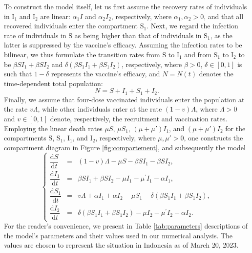 \documentclass[11pt,reqno]{amsart}
\newcommand{\de}{\text{d}}
\begin{document}
To construct the model itself, let us first assume the recovery rates of individuals in $\text{I}_1$ and $\text{I}_2$ are linear: $\alpha_1 I$ and $\alpha_2 I_2$, respectively, where $\alpha_1,\alpha_2>0$, and that all  recovered individuals enter the compartment $\text{S}_1$. Next, we regard the infection rate of individuals in $\text{S}$ as being higher than that of individuals in $\text{S}_1$, as the latter is suppressed by the vaccine's efficacy. Assuming the infection rates to be bilinear, we thus formulate the transition rates from $\text{S}$ to $\text{I}_1$ and from $\text{S}_1$ to $\text{I}_2$ to be $\beta SI_1 + \beta SI_2$ and $\delta\left(\beta S_1I_1 + \beta S_1I_2\right)$, respectively, where $\beta>0$, $\delta\in[0,1]$ is such that $1-\delta$ represents the vaccine's efficacy, and $N=N(t)$ denotes the time-dependent total population:
\begin{equation}\label{eq:totalpopulation}
N=S+I_1+S_1+I_2.
\end{equation}
Finally, we assume that four-dose vaccinated individuals enter the population at the rate $v\Lambda$, while other individuals enter at the rate $(1-v)\Lambda$, where $\Lambda>0$ and $v\in[0,1]$ denote, respectively, the recruitment and vaccination rates. Employing the linear death rates $\mu S$, $\mu S_1$, $\left(\mu+\mu'\right)I_1$, and $\left(\mu+\mu'\right)I_2$ for the compartments $\text{S}$, $\text{S}_1$, $\text{I}_1$, and $\text{I}_2$, respectively, where $\mu,\mu'>0$, one constructs the compartment diagram in Figure \ref{fig:compartement}, and subsequently the model 
\begin{equation}\label{eq:model}
\left\{\begin{array}{rcl}
\dfrac{\de S}{\de t} \!\!\!&=&\!\!\!\left( 1-v \right) \Lambda -\mu S-\beta SI_{1}-\beta SI_{2},\\[0.3cm]
\dfrac{\de I_{1}}{\de t} \!\!\!&=&\!\!\!\beta SI_{1}+\beta SI_{2}-\mu
I_{1}-\mu ^{\prime }I_{1}-\alpha I_{1},\\[0.3cm]
\dfrac{\de S_{1}}{\de t} \!\!\!&=&\!\!\!v \Lambda +\alpha I_{1}+\alpha I_{2} -\mu S_{1}-\delta \left( 
\beta S_{1}I_{1}+\beta S_{1}I_{2}\right),\\[0.3cm]
\dfrac{\de I_{2}}{\de t} \!\!\!&=&\!\!\!\delta \left( \beta S_{1}I_{1}+\beta
S_{1}I_{2}\right)-\mu I_{2}-\mu ^{\prime }I_{2} -\alpha I_{2}.
\end{array}\right.
\end{equation}
For the reader's convenience, we present in Table \ref{tab:parameters} descriptions of the model's parameters and their values used in our numerical analysis. The values are chosen to represent the situation in Indonesia as of March 20, 2023.
\end{document}
